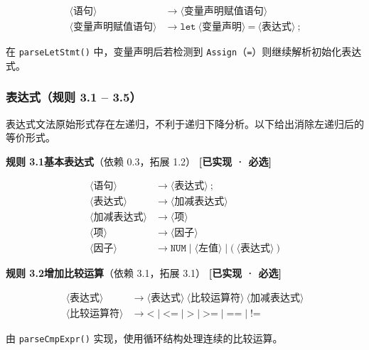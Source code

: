 \documentclass[12pt,a4paper]{ctexart}
\begin{document}
\begin{align}
\langle\text{语句}\rangle &\rightarrow \langle\text{变量声明赋值语句}\rangle \\
\langle\text{变量声明赋值语句}\rangle &\rightarrow \texttt{let} \ \langle\text{变量声明}\rangle \ \texttt{=} \ \langle\text{表达式}\rangle \ \texttt{;}
\end{align}

在 \texttt{parseLetStmt()} 中，变量声明后若检测到 \texttt{Assign}（\texttt{=}）则继续解析初始化表达式。

\subsubsection{表达式（规则 3.1 -- 3.5）}

表达式文法原始形式存在左递归，不利于递归下降分析。以下给出消除左递归后的等价形式。

\textbf{规则 3.1\quad 基本表达式}（依赖 0.3，拓展 1.2） \hfill \textcolor{green!60!black}{\textbf{[已实现 · 必选]}}

\begin{align}
\langle\text{语句}\rangle &\rightarrow \langle\text{表达式}\rangle \ \texttt{;} \\
\langle\text{表达式}\rangle &\rightarrow \langle\text{加减表达式}\rangle \\
\langle\text{加减表达式}\rangle &\rightarrow \langle\text{项}\rangle \\
\langle\text{项}\rangle &\rightarrow \langle\text{因子}\rangle \\
\langle\text{因子}\rangle &\rightarrow \texttt{NUM} \mid \langle\text{左值}\rangle \mid \texttt{(} \ \langle\text{表达式}\rangle \ \texttt{)}
\end{align}

\textbf{规则 3.2\quad 增加比较运算}（依赖 3.1，拓展 3.1） \hfill \textcolor{green!60!black}{\textbf{[已实现 · 必选]}}

\begin{align}
\langle\text{表达式}\rangle &\rightarrow \langle\text{表达式}\rangle \ \langle\text{比较运算符}\rangle \ \langle\text{加减表达式}\rangle \\
\langle\text{比较运算符}\rangle &\rightarrow \texttt{<} \mid \texttt{<=} \mid \texttt{>} \mid \texttt{>=} \mid \texttt{==} \mid \texttt{!=}
\end{align}

由 \texttt{parseCmpExpr()} 实现，使用循环结构处理连续的比较运算。
\end{document}
